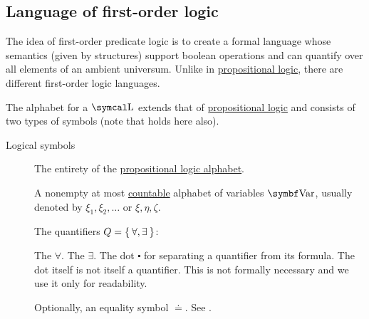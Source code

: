 \subsection{Language of first-order logic}\label{subsec:language_of_first_order_logic}

\begin{definition}\label{def:first_order_language}
  The idea of first-order predicate logic is to create a formal language whose semantics (given by structures) support boolean operations and can quantify over all elements of an ambient universum. Unlike in \hyperref[subsec:language_of_propositional_logic]{propositional logic}, there are different first-order logic languages.

  The alphabet for a  \( \CL \) extends that of \hyperref[subsec:language_of_propositional_logic]{propositional logic} and consists of two types of symbols (note that  holds here also).

  \begin{description}
    \item[Logical symbols]\mbox{}
    \begin{DefEnum}[series=def:first_order_language]
       The entirety of the \hyperref[subsec:language_of_propositional_logic]{propositional logic alphabet}.

       A nonempty at most \hyperref[rem:cardinals/countable]{countable} alphabet of variables \( \Bold{Var} \), usually denoted by \( \xi_1, \xi_2, \ldots \) or \( \xi, \eta, \zeta \).

       The quantifiers \( Q = \Set{ \forall, \exists } \):
      \begin{DefEnum}
         The  \( \forall \).
         The  \( \exists \).
         The dot \( \centerdot \) for separating a quantifier from its formula. The dot itself is not itself a quantifier. This is not formally necessary and we use it only for readability.
      \end{DefEnum}

       Optionally, an equality symbol \( \doteq \). See .
    \end{DefEnum}


\end{description}
\end{definition}
